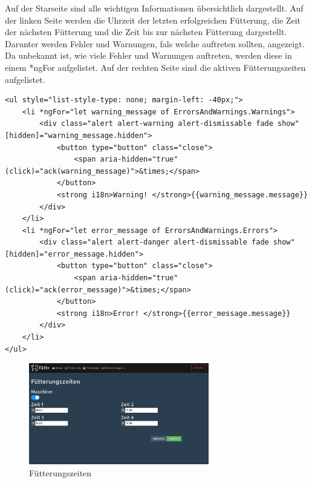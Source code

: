Auf der Starseite sind alle wichtigen Informationen übersichtlich dargestellt. Auf der linken Seite werden die Uhrzeit der letzten erfolgreichen Fütterung, die Zeit der nächsten Fütterung und die Zeit bis zur nächsten Fütterung dargestellt. Darunter werden Fehler und Warnungen, fals welche auftreten sollten, angezeigt. Da unbekannt ist, wie viele Fehler und Warnungen auftreten, werden diese in einem *ngFor aufgelistet. Auf der rechten Seite sind die aktiven Fütterungszeiten aufgelistet.

\begin{lstlisting}[style=HtmlStyle,caption=Errors and Warnings in einem *ngFor]
<ul style="list-style-type: none; margin-left: -40px;">
	<li *ngFor="let warning_message of ErrorsAndWarnings.Warnings">
    	<div class="alert alert-warning alert-dismissable fade show" [hidden]="warning_message.hidden">
        	<button type="button" class="close">
            	<span aria-hidden="true" (click)="ack(warning_message)">&times;</span>
            </button>
            <strong i18n>Warning! </strong>{{warning_message.message}}
        </div>
    </li>
    <li *ngFor="let error_message of ErrorsAndWarnings.Errors">
        <div class="alert alert-danger alert-dismissable fade show" [hidden]="error_message.hidden">
	        <button type="button" class="close">
	            <span aria-hidden="true" (click)="ack(error_message)">&times;</span>
            </button>
            <strong i18n>Error! </strong>{{error_message.message}}
        </div>
    </li>
</ul>
\end{lstlisting}

\begin{figure}
\vspace{-30pt}
  \begin{center}
    \includegraphics[width=0.7\textwidth]{Bilder/Greistorfer/Fuetterungszeiten.png}
  \end{center}
  \caption{Fütterungszeiten}
  \label{Fütterungszeiten}
  \vspace{-10pt}
\end{figure}

